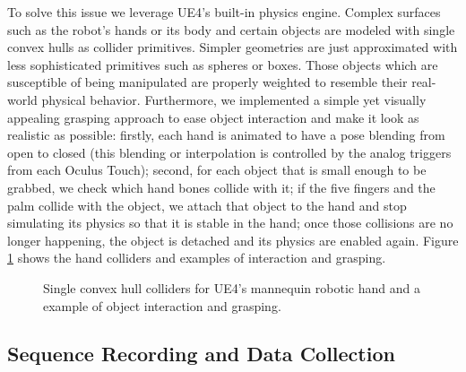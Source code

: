 To solve this issue we leverage \ac{UE4}'s built-in physics engine. Complex surfaces such as the robot's hands or its body and certain objects are modeled with single convex hulls as collider primitives. Simpler geometries are just approximated with less sophisticated primitives such as spheres or boxes. Those objects which are susceptible of being manipulated are properly weighted to resemble their real-world physical behavior. Furthermore, we implemented a simple yet visually appealing grasping approach to ease object interaction and make it look as realistic as possible: firstly, each hand is animated to have a pose blending from open to closed (this blending or interpolation is controlled by the analog triggers from each Oculus Touch); second, for each object that is small enough to be grabbed, we check which hand bones collide with it; if the five fingers and the palm collide with the object, we attach that object to the hand and stop simulating its physics so that it is stable in the hand; once those collisions are no longer happening, the object is detached and its physics are enabled again. Figure \ref{fig:object_interaction} shows the hand colliders and examples of interaction and grasping.

\begin{figure}[!htb]
  \centering
  \caption{Single convex hull colliders for \ac{UE4}'s mannequin robotic hand and a example of object interaction and grasping.}
  \label{fig:object_interaction}
\end{figure}

\subsection{Sequence Recording and Data Collection}

